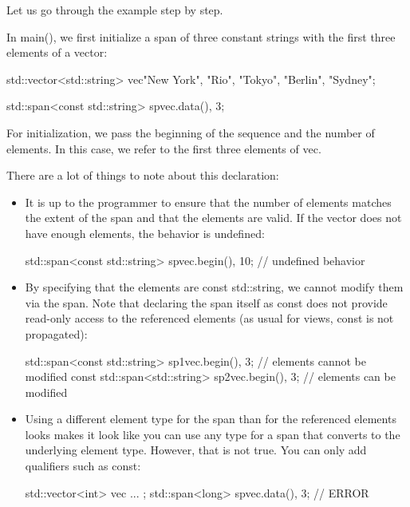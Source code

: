 Let us go through the example step by step.


In main(), we first initialize a span of three constant strings with the first three elements of a vector:

\begin{cpp}
std::vector<std::string> vec{"New York", "Rio", "Tokyo", "Berlin", "Sydney"};

std::span<const std::string> sp{vec.data(), 3};
\end{cpp}

For initialization, we pass the beginning of the sequence and the number of elements. In this case, we refer to the first three elements of vec.

There are a lot of things to note about this declaration:

\begin{itemize}
\item
It is up to the programmer to ensure that the number of elements matches the extent of the span and that the elements are valid. If the vector does not have enough elements, the behavior is undefined:

\begin{cpp}
std::span<const std::string> sp{vec.begin(), 10}; // undefined behavior
\end{cpp}

\item
By specifying that the elements are const std::string, we cannot modify them via the span. Note that declaring the span itself as const does not provide read-only access to the referenced elements (as usual for views, const is not propagated):

\begin{cpp}
std::span<const std::string> sp1{vec.begin(), 3}; // elements cannot be modified
const std::span<std::string> sp2{vec.begin(), 3}; // elements can be modified
\end{cpp}

\item
Using a different element type for the span than for the referenced elements looks makes it look like you can use any type for a span that converts to the underlying element type. However, that is not true. You can only add qualifiers such as const:

\begin{cpp}
std::vector<int> vec{ ... };
std::span<long> sp{vec.data(), 3}; // ERROR
\end{cpp}
\end{itemize}


